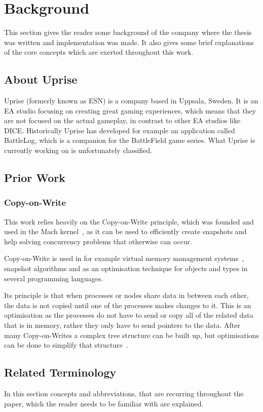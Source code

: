 \documentclass[a4paper,12pt]{article}
\begin{document}
\newpage
\section{Background}
This section gives the reader some background of the company where the thesis was written and
implementation was made. It also gives some brief explanations of the core concepts which are 
exerted throughout this work. 

\subsection{About Uprise}
Uprise (formerly known as ESN) is a company based in Uppsala, Sweden. It is an EA studio focusing on
creating great gaming experiences, which means that they are not focused on the actual gameplay, in
contrast to other EA studios like DICE. Historically Uprise has developed for example an
application called BattleLog, which is a companion for the BattleField game series. What Uprise is
currently working on is unfortunately classified.

\subsection{Prior Work}
\subsubsection{Copy-on-Write}
This work relies heavily on the Copy-on-Write principle, which was founded and used in the Mach
kernel~\cite{COPYONWRITE}, as it can be used to efficiently create snapshots and help solving
concurrency problems that otherwise can occur.

Copy-on-Write is used in for example virtual memory management systems~\cite{VIRTCOW}, snapshot
algorithms and as an optimisation technique for objects and types in several programming
languages\cite{LANGCOW}.

Its principle is that when processes or nodes share data in between each other, the data is not
copied until one of the processes makes changes to it. This is an optimisation as the processes do
not have to send or copy all of the related data that is in memory, rather they only have to send
pointers to the data. After many Copy-on-Writes a complex tree structure can be built up, but
optimisations can be done to simplify that structure~\cite{COPYONWRITE2}.

\newpage
\subsection{Related Terminology}
In this section concepts and abbreviations, that are recurring throughout the paper, which the
reader needs to be familiar with are explained.
\end{document}
